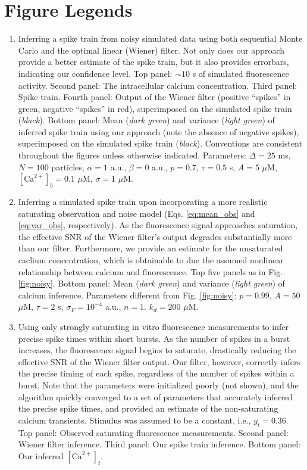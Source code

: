 \documentclass[12pt]{article}
\newcommand{\Ca}{[\text{Ca}^{2+}]}
\begin{document}
\clearpage \newpage
\section*{Figure Legends}
\begin{enumerate}
\item Inferring a spike train from noisy simulated data using both sequential Monte Carlo and the optimal linear (Wiener) filter. Not only does our approach provide a better estimate of the spike train, but it also provides errorbars, indicating our confidence level. Top panel: $\sim 10$ s of simulated fluorescence activity. Second panel: The intracellular calcium concentration.  Third panel: Spike train.  Fourth panel: Output of the Wiener filter (positive ``spikes'' in green, negative ``spikes'' in red), superimposed on the simulated spike train (\emph{black}).  Bottom panel: Mean (\emph{dark green}) and variance (\emph{light green}) of inferred spike train using our approach (note the absence of negative spikes), superimposed on the simulated spike train (\emph{black}).  Conventions are consistent throughout the figures unless otherwise indicated. Parameters: $\Delta=25$ ms, $N=100$ particles, $\alpha=1$ a.u., $\beta=0$ a.u., $p=0.7$, $\tau=0.5$ s, $A=5$ $\mu$M, $\Ca_b=0.1$ $\mu$M, $\sigma=1$ $\mu$M.
\item Inferring a simulated spike train upon incorporating a more realistic saturating observation and noise model (Eqs. \ref{eq:mean_obs} and \ref{eq:var_obs}, respectively). As the fluorescence signal approaches saturation, the effective SNR of the Wiener filter's output degrades substantially more than our filter.  Furthermore, we provide an estimate for the unsaturated caclium concentration, which is obtainable to due the assumed nonlinear relationship between calcium and fluorescence. Top five panels as in Fig. \ref{fig:noisy}. Bottom panel: Mean (\emph{dark green}) and variance (\emph{light green}) of calcium inference.  Parameters different from Fig. \ref{fig:noisy}: $p=0.99$, $A=50$ $\mu$M, $\tau=2$ s, $\sigma_F=10^{-4}$ a.u., $n=1$. $k_d=200$ $\mu$M.  
\item Using only strongly saturating in vitro fluorescence measurements to infer precise spike times within short bursts. As the number of spikes in a burst increases, the fluorescence signal begins to saturate, drastically reducing the effective SNR of the Wiener filter output. Our filter, however, correctly infers the precise timing of each spike, regardless of the number of spikes within a burst. Note that the parameters were initialized poorly (not shown), and the algorithm quickly converged to a set of parameters that accurately inferred the precise spike times, and provided an estimate of the non-saturating calcium transients.  Stimulus was assumed to be a constant, i.e., $y_t=0.36$.  Top panel: Observed saturating fluorescence measurements. Second panel: Wiener filter inference.  Third panel: Our spike train inference.  Bottom panel: Our inferred $\Ca_t$.

\end{enumerate}
\end{document}
